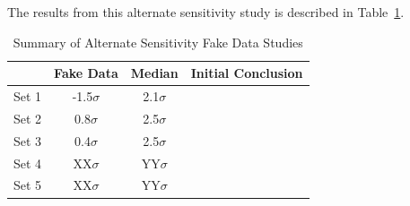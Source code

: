 The results from this alternate sensitivity study is described in Table~\ref{tab:fakedata:altsens}.

\begin{table}[h!]
\centering
\begin{center}
\begin{tabular}{ c|c|c|c } 
 & Fake Data & Median & Initial Conclusion \\ 
\hline \hline
 Set 1 & -1.5$\sigma$ & 2.1$\sigma$ & \\ 
 Set 2 & 0.8$\sigma$ & 2.5$\sigma$ &  \\ 
 Set 3 & 0.4$\sigma$ & 2.5$\sigma$ &   \\ 
 Set 4 & XX$\sigma$ & YY$\sigma$ &  \\ 
 Set 5 & XX$\sigma$ & YY$\sigma$ &  \\ 
 \hline \hline
\end{tabular}
\end{center}
\caption{Summary of Alternate Sensitivity Fake Data Studies}
\label{tab:fakedata:altsens}
\end{table}

